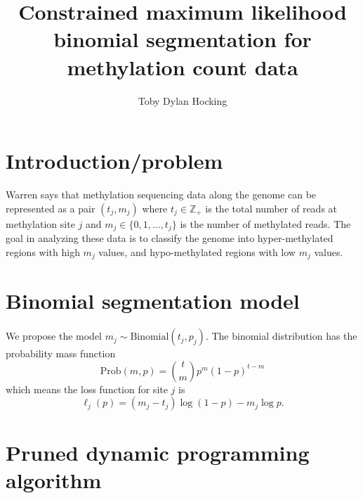 \documentclass[12pt]{article}
\newcommand{\ZZ}{\mathbb Z}
\begin{document}
\title{Constrained maximum likelihood binomial segmentation for
  methylation count data}

\author{Toby Dylan Hocking}

\maketitle

\section{Introduction/problem}

Warren says that methylation sequencing data along the genome can be
represented as a pair $(t_j, m_j)$ where $t_j\in\ZZ_+$ is the total
number of reads at methylation site $j$ and $m_j\in\{0,1,\dots, t_j\}$
is the number of methylated reads. The goal in analyzing these data is
to classify the genome into hyper-methylated regions with high $m_j$
values, and hypo-methylated regions with low $m_j$ values.

\section{Binomial segmentation model}

We propose the model $m_j \sim \text{Binomial}(t_j, p_j)$. The
binomial distribution has the probability mass function
\begin{equation}
  \label{eq:binomial-prob}
  \text{Prob}(m, p) = \binom{t}{m} p^m (1-p)^{t-m}
\end{equation}
which means the loss function for site $j$ is
\begin{equation}
  \label{eq:binomial-loss}
  \ell_j(p) = (m_j - t_j) \log(1-p) - m_j\log p.
\end{equation}

\section{Pruned dynamic programming algorithm}
\end{document}
